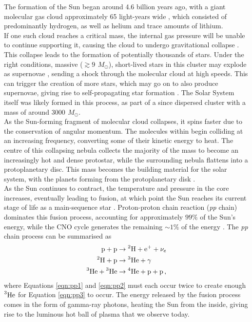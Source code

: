 \documentclass[11pt,a4paper,onecolumn]{report}
\newcommand*\chem[1]{\ensuremath{\mathrm{#1}}}
\begin{document}
The formation of the Sun began around 4.6 billion years ago, with a giant
molecular gas cloud approximately 65 light-years wide
\citep{montmerle_solar_2006}, which consisted of predominantly hydrogen, as well
as helium and trace amounts of lithium. \\

If one such cloud reaches a critical mass, the internal gas pressure will be
unable to continue supporting it, causing the cloud to undergo gravitational
collapse \citep{jeans_stability_1902}. This collapse leads to the formation of
potentially thousands of stars. Under the right conditions, massive (\(\gtrsim
\SI{9}{\,M_\odot} \)), short-lived stars in this cluster may explode as
supernovae \citep{heger_how_2003}, sending a shock through the molecular cloud
at high speeds. This can trigger the creation of more stars, which may go on to
also produce supernovae, giving rise to self-propagating star formation
\citep{mueller_propagating_1976}. The Solar System itself was likely formed in
this process, as part of a since dispersed cluster with a mass of around
\(\SI{3000}{\,M_\odot} \)\citep{williams_astrophysical_2010,zwart_lost_2009}. \\

As the Sun-forming fragment of molecular cloud collapses, it spins faster due to
the conservation of angular momentum. The molecules within begin colliding at an
increasing frequency, converting some of their kinetic energy to heat. The
centre of this collapsing nebula collects the majority of the mass to become an
increasingly hot and dense protostar, while the surrounding nebula flattens into
a protoplanetary disc. This mass becomes the building material for the solar
system, with the planets forming from the protoplanetary disk
\citep{greaves_disks_2005}. \\

As the Sun continues to contract, the temperature and pressure in the core
increases, eventually leading to fusion, at which point the Sun reaches its
current stage of life as a main-sequence star \citep{woolfson_origin_2000}.
Proton-proton chain reaction (\textit{pp} chain) dominates this fusion process,
accounting for approximately $99\%$ of the Sun's energy, while the CNO cycle
generates the remaining \(\sim 1\%\) of the energy \citep{adelberger_solar_2011}.
The \textit{pp} chain process can be summarised as
\begin{align}
  \chem{p} + \chem{p} &\rightarrow \chem{\prescript{2}{}H} + \chem{e^+} +
  \nu_e \label{eqn:pp1}\\
  \chem{\prescript{2}{}H} + \chem{p} &\rightarrow \chem{\prescript{3}{}He}
  + \gamma \label{eqn:pp2}\\
  \chem{\prescript{3}{}He} + \chem{\prescript{3}{}He} & \rightarrow
  \chem{\prescript{4}{}He} + \chem{p} + \chem{p}\,, \label{eqn:pp3}
\end{align}
where Equations \ref{eqn:pp1} and \ref{eqn:pp2} must each occur twice to create
enough $\chem{\prescript{3}{}He}$ for Equation \ref{eqn:pp3} to occur. The
energy released by the fusion process comes in the form of gamma-ray photons,
heating the Sun from the inside, giving rise to the luminous hot ball of plasma
that we observe today. \\
\end{document}
